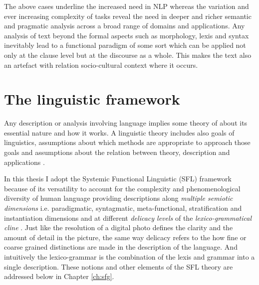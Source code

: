 The above cases underline the increased need in NLP whereas the variation and ever increasing complexity of tasks reveal the need in deeper and richer semantic and pragmatic analysis across a broad range of domains and applications. Any analysis of text beyond the formal aspects such as morphology, lexis and syntax inevitably lead to a functional paradigm of some sort which can be applied not only at the clause level but at the discourse as a whole. This makes the text also an artefact with relation socio-cultural context where it occurs. 

\section{The linguistic framework}
\label{sec:framework}
Any description or analysis involving language implies some theory of about its essential nature and how it works. A linguistic theory includes also goals of linguistics, assumptions about which methods are appropriate to approach those goals and assumptions about the relation between theory, description and applications \citep{Fawcett2000}. 

In this thesis I adopt the Systemic Functional Linguistic (SFL) framework because of its versatility to account for the complexity and phenomenological diversity of human language providing descriptions along \textit{multiple semiotic dimensions} i.e. paradigmatic, syntagmatic, meta-functional, stratification and instantiation dimensions \citep{Halliday2003} and at different \textit{delicacy levels} of the \textit{lexico-grammatical cline} \citep{Halliday2002, Hasan2014}. Just like the resolution of a digital photo defines the clarity and the amount of detail in the picture, the same way delicacy refers to the how fine or coarse grained distinctions are made in the description of the language. And intuitively the lexico-grammar is the combination of the lexis and grammar into a single description. These notions and other elements of the SFL theory are addressed below in Chapter \ref{ch:sfg}.


